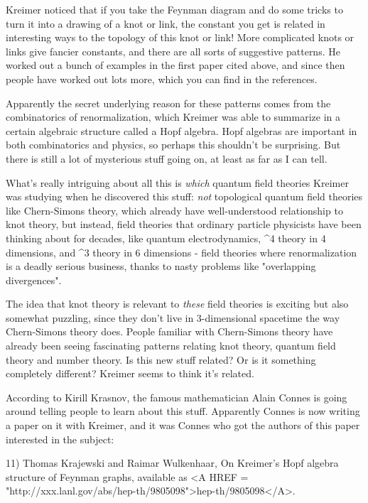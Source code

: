 Kreimer noticed that if you take the Feynman diagram and do some
tricks to turn it into a drawing of a knot or link, the constant
you get is related in interesting ways to the topology of this knot
or link!  More complicated knots or links give fancier constants, 
and there are all sorts of suggestive patterns.  He worked out a 
bunch of examples in the first paper cited above, and since then 
people have worked out lots more, which you can find in the 
references.  

Apparently the secret underlying reason for these patterns comes
from the combinatorics of renormalization, which Kreimer was able
to summarize in a certain algebraic structure called a Hopf algebra.
Hopf algebras are important in both combinatorics and physics, so 
perhaps this shouldn't be surprising.  But there is still a lot of 
mysterious stuff going on, at least as far as I can tell.  

What's really intriguing about all this is \emph{which} quantum field 
theories Kreimer was studying when he discovered this stuff: \emph{not}
topological quantum field theories like Chern-Simons theory, which 
already have well-understood relationship to knot theory, but instead, 
field theories that ordinary particle physicists have been thinking 
about for decades, like quantum electrodynamics, \phi ^{4} theory in 4 
dimensions, and \phi ^{3} theory in 6 dimensions - field theories where 
renormalization is a deadly serious business, thanks to nasty problems 
like "overlapping divergences".

The idea that knot theory is relevant to \emph{these} field theories 
is exciting but also somewhat puzzling, since they don't live in 
3-dimensional spacetime the way Chern-Simons theory does.  People 
familiar with Chern-Simons theory have already been seeing fascinating 
patterns relating knot theory, quantum field theory and number theory.  
Is this new stuff related?  Or is it something completely different?  
Kreimer seems to think it's related.  

According to Kirill Krasnov, the famous mathematician Alain Connes is 
going around telling people to learn about this stuff.  Apparently 
Connes is now writing a paper on it with Kreimer, and it was Connes 
who got the authors of this paper interested in the subject:

11) Thomas Krajewski and Raimar Wulkenhaar, On Kreimer's Hopf algebra
structure of Feynman graphs, available as <A HREF =
"http://xxx.lanl.gov/abs/hep-th/9805098">hep-th/9805098</A>.

